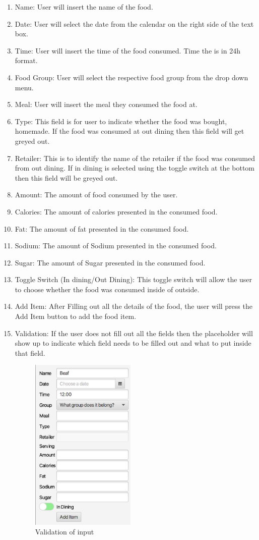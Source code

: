 \documentclass{scrreprt}
\begin{document}
\FloatBarrier

\begin{enumerate}
\item Name: User will insert the name of the food.
\item Date: User will select the date from the calendar on the right side of the text box.
\item Time: User will insert the time of the food consumed. Time the is in 24h format.
\item Food Group: User will select the respective food group from the drop down menu.
\item Meal: User will insert the meal they consumed the food at.
\item Type: This field is for user to indicate whether the food was bought, homemade. If the food was consumed at out dining then this field will get greyed out.
\item Retailer: This is to identify the name of the retailer if the food was consumed from out dining. If in dining is selected using the toggle switch at the bottom then this field will be greyed out.
\item Amount: The amount of food consumed by the user.
\item Calories: The amount of calories presented in the consumed food.
\item Fat: The amount of fat presented in the consumed food.
\item Sodium: The amount of Sodium presented in the consumed food.
\item Sugar: The amount of Sugar presented in the consumed food.
\item Toggle Switch (In dining/Out Dining): This toggle switch will allow the user to choose whether the food was consumed inside of outside.
\item Add Item: After Filling out all the details of the food, the user will press the Add Item button to add the food item.
\item Validation: If the user does not fill out all the fields then the placeholder will show up to indicate which field needs to be filled out and what to put inside that field.

\begin{figure}[!htbp]
\centering
\includegraphics[width=5cm]{pictures/err-add-item.png}
\caption{Validation of input}
\end{figure}


\end{enumerate}
\end{document}
